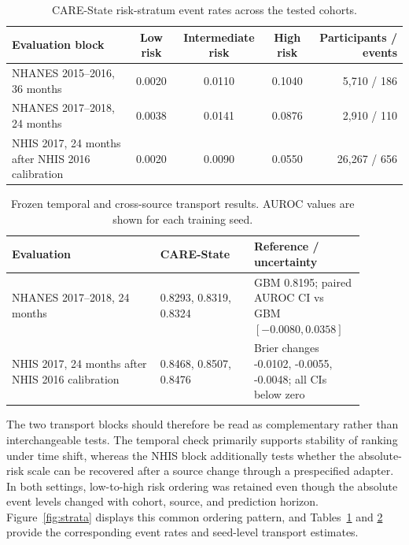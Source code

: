 \documentclass[12pt]{article}
\begin{document}
\begin{table}[t]
\centering
\caption{CARE-State risk-stratum event rates across the tested cohorts.}
\label{tab:strata}
\small
\begin{tabularx}{0.98\linewidth}{>{\raggedright\arraybackslash}X c c c r}
\toprule
Evaluation block & Low risk & Intermediate risk & High risk & Participants / events \\
\midrule
NHANES 2015--2016, 36 months & 0.0020 & 0.0110 & 0.1040 & 5,710 / 186 \\
NHANES 2017--2018, 24 months & 0.0038 & 0.0141 & 0.0876 & 2,910 / 110 \\
NHIS 2017, 24 months after NHIS 2016 calibration & 0.0020 & 0.0090 & 0.0550 & 26,267 / 656 \\
\bottomrule
\end{tabularx}
\end{table}

\begin{table}[t]
\centering
\caption{Frozen temporal and cross-source transport results. AUROC values are shown for each training seed.}
\label{tab:transport}
\begin{tabular}{p{0.38\linewidth}p{0.24\linewidth}p{0.27\linewidth}}
\toprule
Evaluation & CARE-State & Reference / uncertainty \\
\midrule
NHANES 2017--2018, 24 months & 0.8293, 0.8319, 0.8324 & GBM 0.8195; paired AUROC CI vs GBM $[-0.0080,0.0358]$ \\
NHIS 2017, 24 months after NHIS 2016 calibration & 0.8468, 0.8507, 0.8476 & Brier changes -0.0102, -0.0055, -0.0048; all CIs below zero \\
\bottomrule
\end{tabular}
\end{table}

The two transport blocks should therefore be read as complementary rather than interchangeable tests. The temporal check primarily supports stability of ranking under time shift, whereas the NHIS block additionally tests whether the absolute-risk scale can be recovered after a source change through a prespecified adapter. In both settings, low-to-high risk ordering was retained even though the absolute event levels changed with cohort, source, and prediction horizon. Figure~\ref{fig:strata} displays this common ordering pattern, and Tables~\ref{tab:strata} and \ref{tab:transport} provide the corresponding event rates and seed-level transport estimates.
\end{document}
